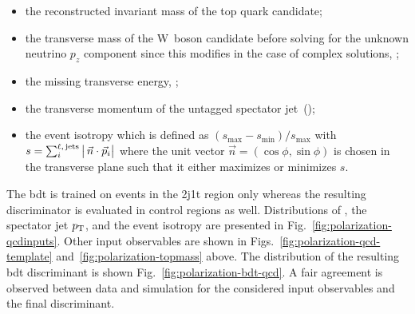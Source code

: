 \begin{itemize}
\item the reconstructed invariant mass of the top quark candidate;
\item the transverse mass of the W~boson candidate before solving for the unknown neutrino $p_{z}$ component since this modifies \pvmiss in the case of complex solutions, \mtw;
\item the missing transverse energy, \met;
\item the transverse momentum of the untagged spectator jet~(\jprime);
\item the event isotropy which is defined as $(s_\mathrm{max}-s_\mathrm{min})/s_\mathrm{max}$ with $s=\sum_{i}^\scriptn{\ell,\,\mathrm{jets}}\big|\,\vec{n}\cdot\vec{p}_{i}\big|$ where the unit vector $\vec{n}=(\cos\phi,\sin\phi)$ is chosen in the transverse plane such that it either maximizes or minimizes $s$.
\end{itemize}

The \gls{bdt} is trained on events in the 2j1t region only whereas the resulting discriminator is evaluated in control regions as well. Distributions of \mtw, the spectator jet $p_\mathrm{T}$, and the event isotropy are presented in Fig.~\ref{fig:polarization-qcdinputs}. Other input observables are shown in Figs.~\ref{fig:polarization-qcd-template} and~\ref{fig:polarization-topmass} above. The distribution of the resulting \gls{bdt} discriminant is shown Fig.~\ref{fig:polarization-bdt-qcd}. A fair agreement is observed between data and simulation for the considered input observables and the final discriminant.



